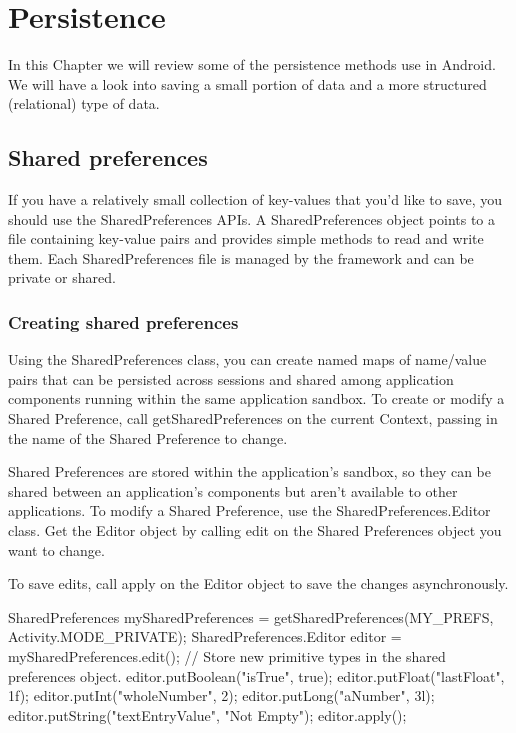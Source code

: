 
\chapter{Persistence}
In this Chapter we will review some of the persistence methods use in Android. We will have a look into saving a small portion of data and a more structured (relational) type of data.

\section{Shared preferences}
If you have a relatively small collection of key-values that you'd like to save, you should use the SharedPreferences APIs. A SharedPreferences object points to a file containing key-value pairs and provides simple methods to read and write them. Each SharedPreferences file is managed by the framework and can be private or shared.

\subsection{Creating shared preferences}
Using the SharedPreferences class, you can create named maps of name/value pairs that can be persisted across sessions and shared among application components running within the same application sandbox. To create or modify a Shared Preference, call getSharedPreferences on the current Context, passing in the name of the Shared Preference to change.

Shared Preferences are stored within the application’s sandbox, so they can be shared between an application’s components but aren’t available to other applications. To modify a Shared Preference, use the SharedPreferences.Editor class. Get the Editor object by calling edit on the Shared Preferences object you want to change.

To save edits, call apply on the Editor object to save the changes asynchronously.
\begin{android}
SharedPreferences mySharedPreferences = getSharedPreferences(MY_PREFS, 
Activity.MODE_PRIVATE);
SharedPreferences.Editor editor = mySharedPreferences.edit();
// Store new primitive types in the shared preferences object.
editor.putBoolean("isTrue", true);
editor.putFloat("lastFloat", 1f);
editor.putInt("wholeNumber", 2);
editor.putLong("aNumber", 3l);
editor.putString("textEntryValue", "Not Empty");
editor.apply();
\end{android}


